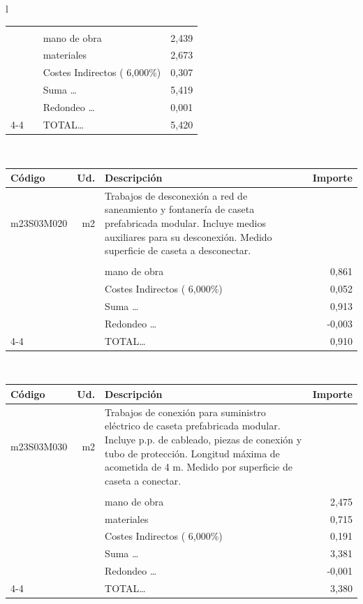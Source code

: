 \documentclass{book}%
\begin{document}
\begin{longtable}{l}
\begin{tabular}{l r p{60mm} r}
&&&\\%
&&mano de obra&     2,439\\%
&&materiales&     2,673\\%
&&Costes Indirectos (     6,000\%)&     0,307\\%
&&Suma \ldots&     5,419\\%
&&Redondeo \ldots&     0,001\\%
\cline{4-4}%
&&TOTAL\ldots&     5,420\\%
\end{tabular}\\%
\begin{tabular}{l r p{60mm} r}%
Código&Ud.&Descripción&Importe\\%
\hline%
m23S03M020&m2&Trabajos de desconexión a red de saneamiento y fontanería de caseta prefabricada modular. Incluye medios auxiliares para su desconexión. Medido superficie de caseta a desconectar.&\\%
&&&\\%
&&mano de obra&     0,861\\%
&&Costes Indirectos (     6,000\%)&     0,052\\%
&&Suma \ldots&     0,913\\%
&&Redondeo \ldots&    {-}0,003\\%
\cline{4-4}%
&&TOTAL\ldots&     0,910\\%
\end{tabular}\\%
\begin{tabular}{l r p{60mm} r}%
Código&Ud.&Descripción&Importe\\%
\hline%
m23S03M030&m2&Trabajos de conexión para suministro eléctrico de caseta prefabricada modular. Incluye p.p. de cableado, piezas de conexión y tubo de protección. Longitud máxima de acometida de 4 m. Medido por superficie de caseta a conectar.&\\%
&&&\\%
&&mano de obra&     2,475\\%
&&materiales&     0,715\\%
&&Costes Indirectos (     6,000\%)&     0,191\\%
&&Suma \ldots&     3,381\\%
&&Redondeo \ldots&    {-}0,001\\%
\cline{4-4}%
&&TOTAL\ldots&     3,380\\%
\end{tabular}\\%
\begin{tabular}{l r p{60mm} r}%

\end{tabular}
\end{longtable}
\end{document}
